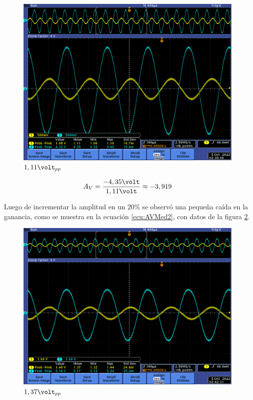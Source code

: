 \documentclass[12pt,letterpaper]{article}     %
\begin{document}
{\begin{figure}[!ht]
\centering
\includegraphics[scale=0.5]{imagenes/1.png}
\caption{$1,11\volt_{pp}$}
\label{fig:1}
\end{figure}

\begin{equation}
	A_V=
	\frac{
		-4,35\volt
	}{
		1,11\volt
	}\approx
	-3,919
\label{ecu:AVMed}
\end{equation}

Luego de incrementar la amplitud en un $20\%$ se observó una pequeña caída en la ganancia,
como se muestra en la ecuación \ref{ecu:AVMed2}, con datos de la figura \ref{fig:2}.

\begin{figure}[!ht]
\centering
\includegraphics[scale=0.5]{imagenes/2.png}
\caption{$1,37\volt_{pp}$}
\label{fig:2}
\end{figure}

}
\end{document}
